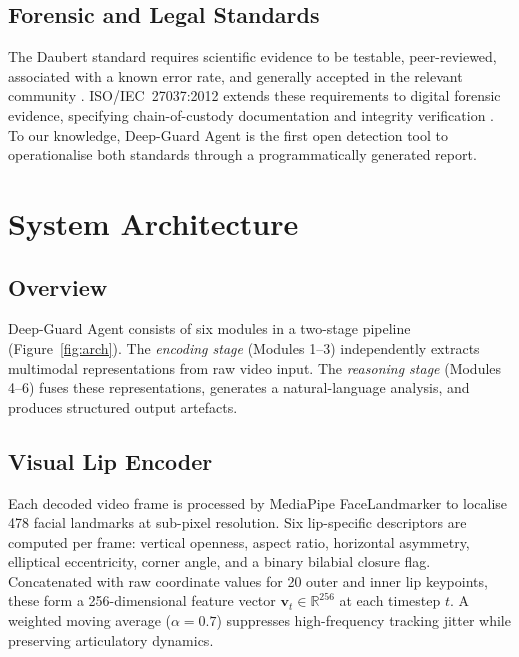 \documentclass[12pt]{article}
\begin{document}
\subsection{Forensic and Legal Standards}

The Daubert standard requires scientific evidence to be testable, peer-reviewed,
associated with a known error rate, and generally accepted in the relevant
community \citep{daubert1993}.
ISO/IEC~27037:2012 extends these requirements to digital forensic evidence,
specifying chain-of-custody documentation and integrity verification
\citep{iso27037}.
To our knowledge, Deep-Guard Agent is the first open detection tool to
operationalise both standards through a programmatically generated report.

\section{System Architecture}

\subsection{Overview}

Deep-Guard Agent consists of six modules in a two-stage pipeline
(Figure~\ref{fig:arch}).
The \textit{encoding stage} (Modules 1--3) independently extracts multimodal
representations from raw video input.
The \textit{reasoning stage} (Modules 4--6) fuses these representations,
generates a natural-language analysis, and produces structured output artefacts.

\subsection{Visual Lip Encoder}

Each decoded video frame is processed by MediaPipe FaceLandmarker to localise
478 facial landmarks at sub-pixel resolution.
Six lip-specific descriptors are computed per frame: vertical openness,
aspect ratio, horizontal asymmetry, elliptical eccentricity, corner angle, and a
binary bilabial closure flag.
Concatenated with raw coordinate values for 20 outer and inner lip keypoints,
these form a 256-dimensional feature vector
$\mathbf{v}_{t} \in \mathbb{R}^{256}$ at each timestep $t$.
A weighted moving average ($\alpha = 0.7$) suppresses high-frequency tracking
jitter while preserving articulatory dynamics.
\end{document}
